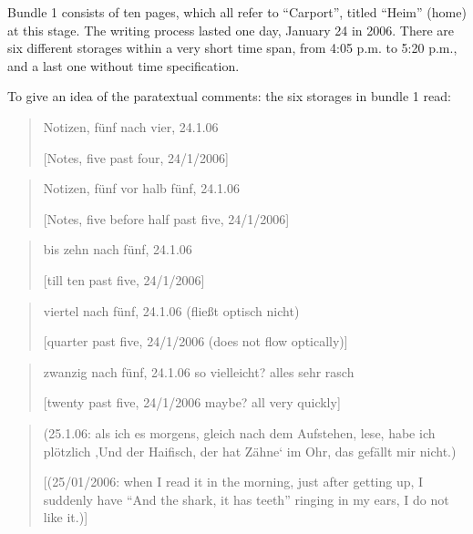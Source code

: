 \documentclass{article}
\begin{document}
Bundle 1 consists of ten pages, which all refer to ``Carport'', titled
``Heim'' (home) at this stage. The writing process lasted one day,
January 24 in 2006. There are six different storages within a very short
time span, from 4:05 p.m. to 5:20 p.m., and a last one without time
specification.

To give an idea of the paratextual comments: the six
storages in bundle 1 read:

\begin{quote}
Notizen, fünf nach vier, 24.1.06

\vspace{1em}

[Notes, five past four, 24/1/2006]
\end{quote}

\begin{quote}
Notizen, fünf vor halb fünf, 24.1.06

\vspace{1em}

[Notes, five before half past five, 24/1/2006]
\end{quote}

\begin{quote}
bis zehn nach fünf, 24.1.06

\vspace{1em}

[till ten past five, 24/1/2006]
\end{quote}

\begin{quote}
viertel nach fünf, 24.1.06 (fließt optisch nicht)

\vspace{1em}

[quarter past five, 24/1/2006 (does not flow optically)]
\end{quote}

\begin{quote}
zwanzig nach fünf, 24.1.06 so vielleicht? alles sehr rasch

\vspace{1em}

[twenty past five, 24/1/2006 maybe? all very quickly]
\end{quote}

\begin{quote}
(25.1.06: als ich es morgens, gleich nach dem Aufstehen, lese, habe ich
plötzlich ‚Und der Haifisch, der hat Zähne` im Ohr, das gefällt mir
nicht.)

\vspace{1em}

[(25/01/2006: when I read it in the morning, just after getting up,
I suddenly have ``And the shark, it has teeth'' ringing in my ears, I do
not like it.)]
\end{quote}
\end{document}
